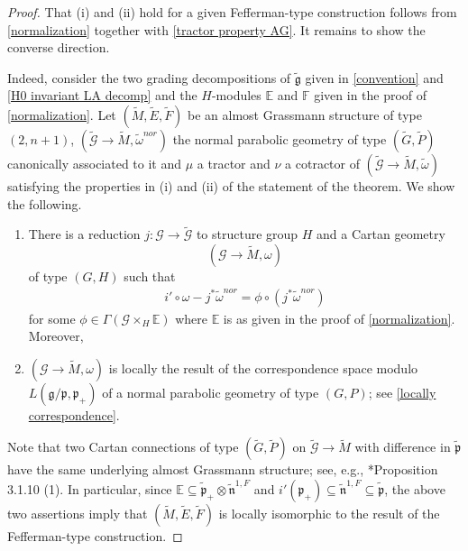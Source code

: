 \documentclass[11pt]{amsart}
\begin{document}
\begin{proof}
That (i) and (ii) hold for a given Fefferman-type construction follows from \cref{normalization} together with \cref{tractor property AG}. It remains to show the converse direction. 

Indeed, consider the two grading decompositions of $\tilde{\mathfrak g}$ given in \cref{convention} and
\cref{H0 invariant LA decomp} and the $H$-modules $\mathbb E$ and $\mathbb F$ given in the proof of \cref{normalization}. Let $(\tilde M,\tilde E,\tilde F)$ be an almost Grassmann structure of type $(2,n+1)$, $(\tilde{\mathcal G}\to \tilde M,\tilde\omega^{nor})$ the normal parabolic geometry of type $(\tilde G,\tilde P)$ canonically associated to it and $\mu$ a tractor and $\nu$ a cotractor of $(\tilde{\mathcal G}\to \tilde M,\tilde\omega)$ satisfying the properties in (i) and (ii) of the statement of the theorem. We show the following.
\begin{enumerate}
    \item[$\bullet$] There is a reduction $j:\mathcal G\to\tilde{\mathcal G}$ to structure group $H$ and a Cartan geometry 
    \[(\mathcal G\to\tilde M,\omega)\]
    of type $(G,H)$ such that
    \begin{align*}
        i'\circ\omega-j^*\tilde\omega^{nor}=\phi\circ(j^*\tilde\omega^{nor})
    \end{align*}
    for some $\phi\in\Gamma(\mathcal G\times_H\mathbb E)$ where $\mathbb E$ is as given in the proof of \cref{normalization}. Moreover,
     \item[$\bullet$] $(\mathcal G\to\tilde M,\omega)$ is locally the result of the correspondence space modulo $L(\mathfrak g/\mathfrak p,\mathfrak p_+)$ of a normal parabolic geometry of type $(G,P)$; see \cref{locally correspondence}.
\end{enumerate}
Note that two Cartan connections of type $(\tilde G,\tilde P)$ on $\tilde{\mathcal G}\to\tilde M$ with difference in $\tilde{\mathfrak p}$ have the same underlying almost Grassmann structure; see, e.g., \cite{Book}*{Proposition 3.1.10 (1)}. In particular, since $\mathbb E\subseteq\tilde{\mathfrak p}_+\otimes\tilde{\mathfrak n}^{1,F}$ and $i'(\mathfrak p_+)\subseteq\tilde{\mathfrak n}^{1,F}\subseteq\tilde{\mathfrak p}$, the above two assertions imply that $(\tilde M,\tilde E,\tilde F)$ is locally isomorphic to the result of the Fefferman-type construction.


\end{proof}
\end{document}
